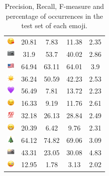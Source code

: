 \documentclass{article}
\begin{document}
\begin{table}
\begin{tabular}{|c|ccc|c|}
\includegraphics[height=0.37cm,width=0.37cm]{img/face_blowing_a_kiss.png} & 20.81 & 7.83 & 11.38 & 2.35\\ 
\includegraphics[height=0.37cm,width=0.37cm]{img/camera.png} & 31.9 & 53.7 & 40.02 & 2.86\\ 
\includegraphics[height=0.37cm,width=0.37cm]{img/United_States.png} & 64.94 & 63.11 & 64.01 & 3.9\\ 
\includegraphics[height=0.37cm,width=0.37cm]{img/sun.png} & 36.24 & 50.59 & 42.23 & 2.53\\ 
\includegraphics[height=0.37cm,width=0.37cm]{img/purple_heart.png} & 56.49 & 7.81 & 13.72 & 2.23\\ 
\includegraphics[height=0.37cm,width=0.37cm]{img/winking_face.png} & 16.33 & 9.19 & 11.76 & 2.61\\ 
\includegraphics[height=0.37cm,width=0.37cm]{img/hundred_points.png} & 32.18 & 26.13 & 28.84 & 2.49\\ 
\includegraphics[height=0.37cm,width=0.37cm]{img/beaming_face_with_smiling_eyes.png} & 20.39 & 6.42 & 9.76 & 2.31\\ 
\includegraphics[height=0.37cm,width=0.37cm]{img/Christmas_tree.png} & 64.12 & 74.82 & 69.06 & 3.09\\ 
\includegraphics[height=0.37cm,width=0.37cm]{img/camera_with_flash.png} & 43.31 & 23.05 & 30.08 & 4.83\\ 
\includegraphics[height=0.37cm,width=0.37cm]{img/winking_face_with_tongue.png} & 12.95 & 1.78 & 3.13 & 2.02\\ 

\hline
\end{tabular}
\caption{\label{table:emoji_detailed} Precision, Recall, F-measure and percentage of occurrences in the test set of each emoji.}
\end{table}
\end{document}
